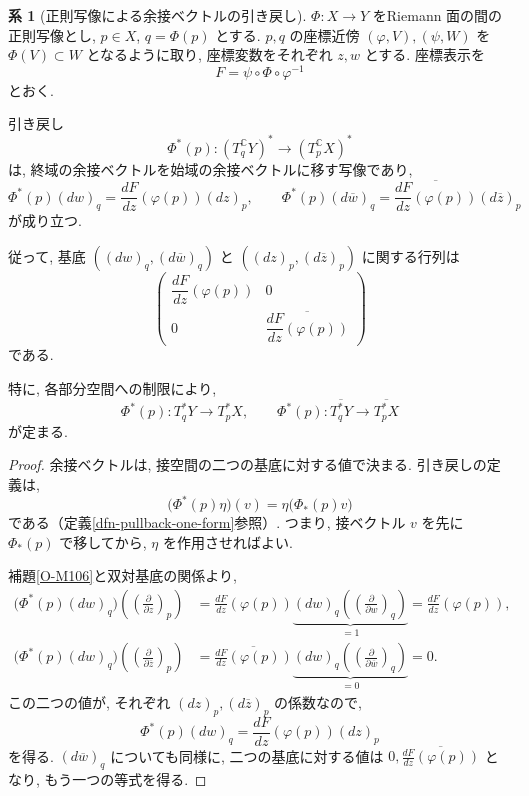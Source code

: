 \documentclass[dvipdfmx,a4paper,11pt]{article} %
\newcommand{\C}{\mathbb{C}}
\theoremstyle{definition}
\numberwithin{equation}{section}
\newtheorem{cor}[thm]{系}
\begin{document}
\begin{cor}[正則写像による余接ベクトルの引き戻し]\label{O-M109}
$\Phi:X\to Y$ をRiemann 面の間の正則写像とし,
$p\in X$, $q=\Phi(p)$ とする.
$p,q$ の座標近傍 $(\varphi,V),(\psi,W)$ を
$\Phi(V)\subset W$ となるように取り,
座標変数をそれぞれ $z,w$ とする.
座標表示を
\[
F=\psi\circ\Phi\circ\varphi^{-1}
\]
とおく.

引き戻し
\[
\Phi^*(p):(T_q^\C Y)^*\longrightarrow(T_p^\C X)^*
\]
は, 終域の余接ベクトルを始域の余接ベクトルに移す写像であり,
\[
\Phi^*(p)(dw)_q
=\frac{dF}{dz}(\varphi(p))(dz)_p,\qquad
\Phi^*(p)(d\overline w)_q
=\overline{\frac{dF}{dz}(\varphi(p))}(d\overline z)_p
\]
が成り立つ.

従って, 基底 $((dw)_q,(d\overline w)_q)$ と
$((dz)_p,(d\overline z)_p)$ に関する行列は
\[
\begin{pmatrix}
\dfrac{dF}{dz}(\varphi(p))&0\\[6pt]
0&\overline{\dfrac{dF}{dz}(\varphi(p))}
\end{pmatrix}
\]
である.

特に, 各部分空間への制限により,
\[
\Phi^*(p):T_q^*Y\longrightarrow T_p^*X,\qquad
\Phi^*(p):\overline{T_q^*Y}\longrightarrow\overline{T_p^*X}
\]
が定まる.
\end{cor}

\begin{proof}
余接ベクトルは, 接空間の二つの基底に対する値で決まる.
引き戻しの定義は,
\[
\bigl(\Phi^*(p)\eta\bigr)(v)
=\eta\bigl(\Phi_*(p)v\bigr)
\]
である（定義\ref{dfn-pullback-one-form}参照）.
つまり, 接ベクトル $v$ を先に $\Phi_*(p)$ で移してから,
$\eta$ を作用させればよい.

補題\ref{O-M106}と双対基底の関係より,
\[
\begin{aligned}
\bigl(\Phi^*(p)(dw)_q\bigr)
\left(\left(\frac{\partial}{\partial z}\right)_p\right)
&=\frac{dF}{dz}(\varphi(p))
\underbrace{(dw)_q
\left(\left(\frac{\partial}{\partial w}\right)_q\right)}_{=1}
=\frac{dF}{dz}(\varphi(p)),\\
\bigl(\Phi^*(p)(dw)_q\bigr)
\left(\left(\frac{\partial}{\partial\overline z}\right)_p\right)
&=\overline{\frac{dF}{dz}(\varphi(p))}
\underbrace{(dw)_q
\left(\left(\frac{\partial}{\partial\overline w}\right)_q\right)}_{=0}
=0.
\end{aligned}
\]
この二つの値が, それぞれ $(dz)_p,(d\overline z)_p$ の係数なので,
\[
\Phi^*(p)(dw)_q=\frac{dF}{dz}(\varphi(p))(dz)_p
\]
を得る.
$(d\overline w)_q$ についても同様に,
二つの基底に対する値は
$0,\overline{\frac{dF}{dz}(\varphi(p))}$ となり,
もう一つの等式を得る.
\end{proof}
\end{document}
